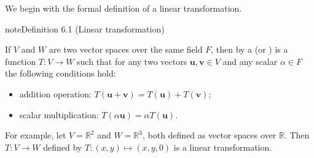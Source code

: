 \documentclass[letterpaper,10pt,english]{jupyterBook}
\begin{document}
\sphinxAtStartPar
We begin with the formal definition of a linear transformation.
\label{_pages/6.0_Linear_transformations:linear-transformation-definition}
\begin{sphinxadmonition}{note}{Definition 6.1 (Linear transformation)}



\sphinxAtStartPar
If \(V\) and \(W\) are two vector spaces over the same field \(F\), then by a  (or ) is a function \(T: V \to W\) such that for any two vectors \(\mathbf{u}, \mathbf{v} \in V\) and any scalar \(\alpha \in F\) the following conditions hold:
\begin{itemize}
\item {} 
\sphinxAtStartPar
addition operation: \(T(\mathbf{u} + \mathbf{v}) = T(\mathbf{u}) + T(\mathbf{v})\);

\item {} 
\sphinxAtStartPar
scalar multiplication:  \(T(\alpha \mathbf{u}) = \alpha T(\mathbf{u})\).

\end{itemize}
\end{sphinxadmonition}

\sphinxAtStartPar
For example, let \(V = \mathbb{R}^2\) and \(W = \mathbb{R}^3\), both defined as vector spaces over \(\mathbb{R}\). Then \(T : V \to W\) defined by \(T : (x, y) \mapsto (x, y, 0)\) is a linear transformation.
\end{document}
